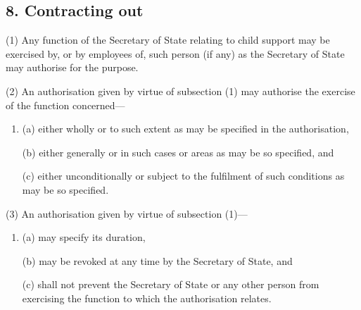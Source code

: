 \documentclass[a4paper]{article}
\begin{document}
%
%
%
%
%
%

\subsection{8. Contracting out}

(1) Any function of the Secretary of State relating to child support may be exercised by, or by employees of, such person (if any) as the Secretary of State may authorise for the purpose.

(2) An authorisation given by virtue of subsection (1) may authorise the exercise of the function concerned—
\begin{enumerate}\item[]
(a) either wholly or to such extent as may be specified in the authorisation,

(b) either generally or in such cases or areas as may be so specified, and

(c) either unconditionally or subject to the fulfilment of such conditions as may be so specified.
\end{enumerate}

(3) An authorisation given by virtue of subsection (1)—
\begin{enumerate}\item[]
(a) may specify its duration,

(b) may be revoked at any time by the Secretary of State, and

(c) shall not prevent the Secretary of State or any other person from exercising the function to which the authorisation relates.
\end{enumerate}
\end{document}
